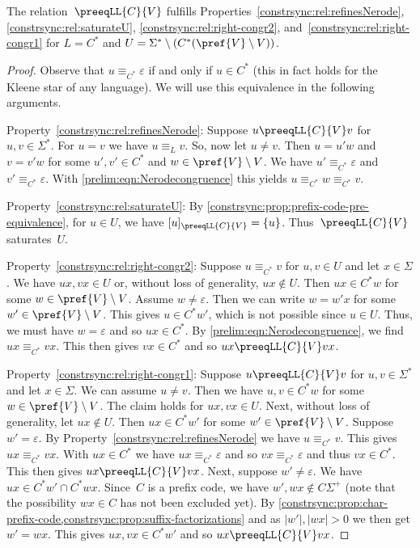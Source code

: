 \begin{proposition} \label{constrsync:prop:properties-simCV}
The relation~$\preeqLL{C}{V}$ fulfills Properties~\ref{constrsync:rel:refinesNerode},
\ref{constrsync:rel:saturateU}, \ref{constrsync:rel:right-congr2}, and~\ref{constrsync:rel:right-congr1}
for $L = C^*$ and $U = \Sigma^* \setminus ( C^* ( \pref{V} \setminus V) )$.
\end{proposition}
\begin{proof}
Observe that $u \equiv_{C^*} \varepsilon$ if and only if $u \in C^*$ (this in fact holds for the Kleene star of any language). We will use this equivalence in the following arguments.	

Property~\ref{constrsync:rel:refinesNerode}: Suppose $u \preeqLL{C}{V} v$ for $u,v \in \Sigma^*$.
For $u = v$ we have $u \equiv_L v$. So, now let $u \ne v$. Then $u = u'w$
and $v = v' w$ for some $u',v' \in C^*$ and $w \in \pref{V} \setminus V$.
We have $u' \equiv_{C^*} \varepsilon$ and $v' \equiv_{C^*} \varepsilon$.
With \cref{prelim:eqn:Nerodecongruence} this yields $u \equiv_{C^*} w \equiv_{C^*} v$.

Property~\ref{constrsync:rel:saturateU}: By \cref{constrsync:prop:prefix-code-pre-equivalence},
for $u \in U$, we have $[u]_{\preeqLL{C}{V}} = \{u\}$. Thus~$\preeqLL{C}{V}$ saturates~$U$.

Property~\ref{constrsync:rel:right-congr2}: Suppose $u \equiv_{C^*} v$ for $u,v \in U$ and let $x\in \Sigma$.
We have $ux, vx \in U$ or, without loss of generality, $ux \notin U$.
Then $ux \in C^*w$ for some $w \in \pref{V} \setminus V$.
Assume $w \ne \varepsilon$. Then we can write $w = w'x$  for some $w' \in \pref{V} \setminus V$.
This gives $u \in C^*w'$, which is not possible since $u \in U$.
Thus, we must have $w = \varepsilon$ and so $ux \in C^*$.
By \cref{prelim:eqn:Nerodecongruence}, we find $ux \equiv_{C^*} vx$.
This then gives $vx \in C^*$ and so $ux \preeqLL{C}{V} vx$.

Property~\ref{constrsync:rel:right-congr1}: 
Suppose $u \preeqLL{C}{V} v$ for $u,v \in \Sigma^*$ and let $x \in \Sigma$.
We can assume $u \ne v$.
Then we have $u,v \in C^*w$
for some $w \in \pref{V} \setminus V$.
The claim holds for $ux, vx \in U$.
Next, without loss of generality, let $ux \notin U$. Then
$ux \in C^*w'$ for some $w' \in \pref{V} \setminus V$.
Suppose $w' = \varepsilon$.
By Property~\ref{constrsync:rel:refinesNerode} we have $u \equiv_{C^*} v$.
This gives $ux \equiv_{C^*} vx$.
With $ux \in C^*$ we have $ux \equiv_{C^*} \varepsilon$
and so $vx \equiv_{C^*} \varepsilon$ and thus $vx \in C^*$.
This then gives $ux \preeqLL{C}{V} vx$.
Next, suppose $w' \ne \varepsilon$.
We have $ux \in C^*w' \cap C^* wx$. 
Since~$C$ is a prefix code, we have $w', wx \notin C\Sigma^+$ (note that the possibility $wx \in C$
has not been excluded yet).
By \cref{constrsync:prop:char-prefix-code,constrsync:prop:suffix-factorizations}
and as $|w'|, |wx| > 0$ we then get $w' = wx$.
This gives $ux, vx \in C^*w'$ and so $ux \preeqLL{C}{V} vx$.
\end{proof} 

